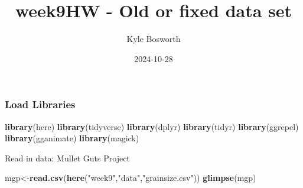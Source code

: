 \documentclass[
]{article}
\title{week9HW - Old or fixed data set}
\author{Kyle Bosworth}
\date{2024-10-28}
\newenvironment{Shaded}{\begin{snugshade}}{\end{snugshade}}
\newcommand{\FunctionTok}[1]{\textcolor[rgb]{0.13,0.29,0.53}{\textbf{#1}}}
\newcommand{\NormalTok}[1]{#1}
\newcommand{\OtherTok}[1]{\textcolor[rgb]{0.56,0.35,0.01}{#1}}
\newcommand{\StringTok}[1]{\textcolor[rgb]{0.31,0.60,0.02}{#1}}
\begin{document}
\maketitle

{
\setcounter{tocdepth}{2}
\tableofcontents
}
\subsubsection{Load Libraries}\label{load-libraries}

\begin{Shaded}
\begin{Highlighting}[]
\FunctionTok{library}\NormalTok{(here)}
\FunctionTok{library}\NormalTok{(tidyverse)}
\FunctionTok{library}\NormalTok{(dplyr)}
\FunctionTok{library}\NormalTok{(tidyr)}
\FunctionTok{library}\NormalTok{(ggrepel)}
\FunctionTok{library}\NormalTok{(gganimate)}
\FunctionTok{library}\NormalTok{(magick)}
\end{Highlighting}
\end{Shaded}

Read in data: Mullet Guts Project

\begin{Shaded}
\begin{Highlighting}[]
\NormalTok{mgp}\OtherTok{\textless{}{-}}\FunctionTok{read.csv}\NormalTok{(}\FunctionTok{here}\NormalTok{(}\StringTok{"week9"}\NormalTok{,}\StringTok{"data"}\NormalTok{,}\StringTok{"grainsize.csv"}\NormalTok{))}
\FunctionTok{glimpse}\NormalTok{(mgp)}
\end{Highlighting}
\end{Shaded}
\end{document}
